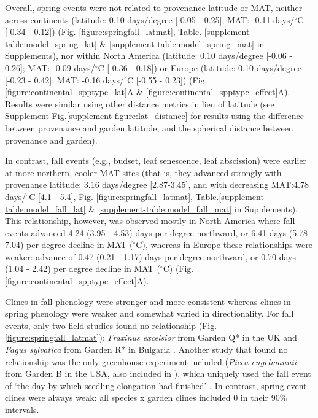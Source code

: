 \documentclass{article}
\begin{document}
Overall, spring events were not related to provenance latitude or MAT, neither across continents (latitude: 0.10 days/degree [-0.05 - 0.25]; MAT: -0.11 days/$^{\circ}$C [-0.34 - 0.12]) (Fig. \ref{figure:springfall_latmat}, Table. \ref{supplement-table:model_spring_lat} \& \ref{supplement-table:model_spring_mat} in Supplements), nor within North America (latitude: 0.10 days/degree [-0.06 - 0.26]; MAT: -0.09 days/$^{\circ}$C [-0.36 - 0.18]) or Europe (latitude: 0.10 days/degree [-0.23 - 0.42]; MAT: -0.16 days/$^{\circ}$C [-0.55 - 0.23]) (Fig.\ref{figure:continental_spptype_lat}A \& \ref{figure:continental_spptype_effect}A). Results were similar using other distance metrics in lieu of latitude (see Supplement Fig.\ref{supplement-figure:lat_distance} for results using the difference between provenance and garden latitude, and the spherical distance between provenance and garden).



In contrast, fall events (e.g., budset, leaf senescence, leaf abscission) were earlier at more northern, cooler MAT sites (that is, they advanced strongly with provenance latitude: 3.16 days/degree [2.87-3.45], and with decreasing MAT:4.78 days/$^{\circ}$C [4.1 - 5.4], Fig. \ref{figure:springfall_latmat}, Table.\ref{supplement-table:model_fall_lat} \& \ref{supplement-table:model_fall_mat} in Supplements). This relationship, however, was observed mostly in North America where fall events advanced 4.24 (3.95 - 4.53) days per degree northward, or 6.41 days (5.78 - 7.04) per degree decline in MAT ($^{\circ}$C), whereas in Europe these relationships were weaker: advance of 0.47 (0.21 - 1.17) days per degree northward, or 0.70 days (1.04 - 2.42) per degree decline in MAT ($^{\circ}$C) (Fig. \ref{figure:continental_spptype_effect}A).


Clines in fall phenology were stronger and more consistent whereas clines in spring phenology were weaker and somewhat varied in directionality. For fall events, only two field studies found no relationship (Fig. \ref{figure:springfall_latmat}): \emph{Fraxinus excelsior} from Garden Q* in the UK \citep{rosique22} and \emph{Fagus sylvatica} from Garden R* in Bulgaria \citep{petkova17}. Another study that found no relationship was the only greenhouse experiment included (\emph{Picea engelmannii} from Garden B in the USA, also included in \citealp{AitkenBemmels16}), which uniquely used the fall event of `the day by which seedling elongation had finished' \citep{rehfeldt94}. In contrast, spring event clines were always weak: all species x garden clines included 0 in their 90\% intervals.
\end{document}
